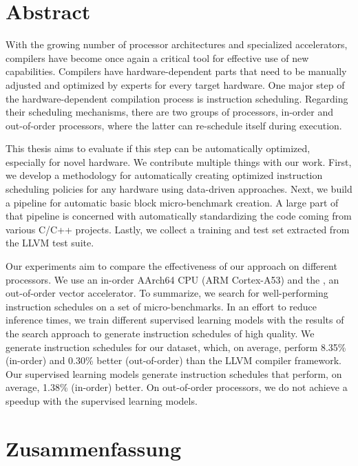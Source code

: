 \chapter*{Abstract}
With the growing number of processor architectures and specialized accelerators, compilers have become once again a critical tool for effective use of new capabilities.
Compilers have hardware-dependent parts that need to be manually adjusted and optimized by experts for every target hardware.
One major step of the hardware-dependent compilation process is instruction scheduling.
Regarding their scheduling mechanisms, there are two groups of processors, in-order and out-of-order processors, where the latter can re-schedule itself during execution.

This thesis aims to evaluate if this step can be automatically optimized, especially for novel hardware.
We contribute multiple things with our work.
First, we develop a methodology for automatically creating optimized instruction scheduling policies for any hardware using data-driven approaches.
Next, we build a pipeline for automatic basic block micro-benchmark creation.
A large part of that pipeline is concerned with automatically standardizing the code coming from various C/C++ projects.
Lastly, we collect a training and test set extracted from the LLVM test suite.

Our experiments aim to compare the effectiveness of our approach on different processors.
We use an in-order AArch64 CPU (ARM Cortex-A53) and the \aurora, an out-of-order vector accelerator.
To summarize, we search for well-performing instruction schedules on a set of micro-benchmarks.
In an effort to reduce inference times, we train different supervised learning models with the results of the search approach to generate instruction schedules of high quality.
We generate instruction schedules for our dataset, which, on average, perform 8.35\% (in-order) and 0.30\% better (out-of-order) than the LLVM compiler framework.
Our supervised learning models generate instruction schedules that perform, on average, 1.38\% (in-order) better.
On out-of-order processors, we do not achieve a speedup with the supervised learning models.

\chapter*{Zusammenfassung}
